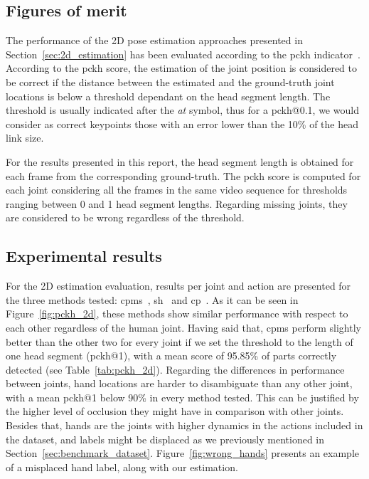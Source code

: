 \subsection{Figures of merit}\label{subsec:2d_metrics}
The performance of the 2D pose estimation approaches presented in Section~\ref{sec:2d_estimation} has been evaluated according to the \gls{pckh} indicator~\cite{andriluka20142d}. According to the \gls{pckh} score, the estimation of the joint position is considered to be correct if the distance between the estimated and the ground-truth joint locations is below a threshold dependant on the head segment length. The threshold is usually indicated after the \textit{at} symbol, thus for a \gls{pckh}@0.1, we would consider as correct keypoints those with an error lower than the 10\% of the head link size.

For the results presented in this report, the head segment length is obtained for each frame from the corresponding ground-truth. The \gls{pckh} score is computed for each joint considering all the frames in the same video sequence for thresholds ranging between 0 and 1 head segment lengths. Regarding missing joints, they are considered to be wrong regardless of the threshold. 

\subsection{Experimental results}\label{subsec:2d_experimental_results}
For the 2D estimation evaluation, results per joint and action are presented for the three methods tested: \glspl{cpm}~\cite{Wei2016-rb}, \gls{sh}~\cite{Newell2016-cy} and \gls{cp}~\cite{Gkioxari2016-ix}. As it can be seen in Figure~\ref{fig:pckh_2d}, these methods show similar performance with respect to each other regardless of the human joint. Having said that, \glspl{cpm} perform slightly better than the other two for every joint if we set the threshold to the length of one head segment (\gls{pckh}@1), with a mean score of 95.85\% of parts correctly detected (see Table~\ref{tab:pckh_2d}). Regarding the differences in performance between joints, hand locations are harder to disambiguate than any other joint, with a mean \gls{pckh}@1 below 90\% in every method tested. This can be justified by the higher level of occlusion they might have in comparison with other joints. Besides that, hands are the joints with higher dynamics in the actions included in the dataset, and labels might be displaced as we previously mentioned in Section~\ref{sec:benchmark_dataset}. Figure~\ref{fig:wrong_hands} presents an example of a misplaced hand label, along with our estimation.

